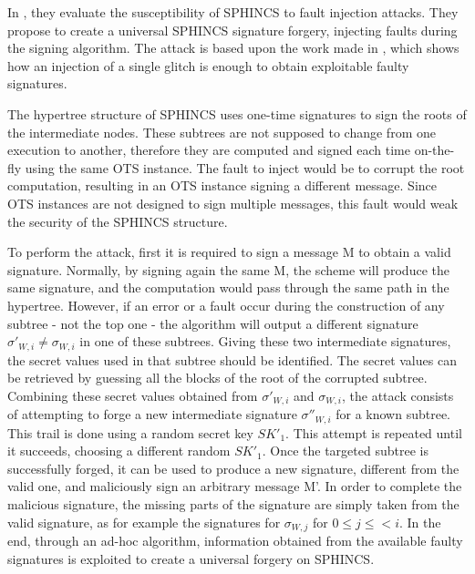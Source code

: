 \documentclass[a4paper,12pt]{article}
\begin{document}

In \cite{12_faultinjection}, they evaluate the susceptibility of SPHINCS to fault injection attacks. They propose to create a universal SPHINCS signature forgery, injecting faults during the signing algorithm.
The attack is based upon the work made in \cite{13_faultattacks}, which shows how an injection of a single glitch is enough to obtain exploitable faulty signatures.

The hypertree structure of SPHINCS uses one-time signatures to sign the roots of the intermediate nodes. These subtrees are not supposed to change from one execution to another, therefore they are computed and signed each time on-the-fly using the same OTS instance.
The fault to inject would be to corrupt the root computation, resulting in an OTS instance signing a different message. Since OTS instances are not designed to sign multiple messages, this fault would weak the security of the SPHINCS structure.

To perform the attack, first it is required to sign a message M to obtain a valid signature.
Normally, by signing again the same M, the scheme will produce the same signature, and the computation would pass through the same path in the hypertree. However, if an error or a fault occur during the construction of any subtree - not the top one - the algorithm will output a different signature $\sigma'_{W,i} \neq \sigma_{W,i}$ in one of these subtrees.
Giving these two intermediate signatures, the secret values used in that subtree should be identified. The secret values can be retrieved by guessing all the blocks of the root of the corrupted subtree.
Combining these secret values obtained from $\sigma'_{W,i}$ and $\sigma_{W,i}$, the attack consists of attempting to forge a new intermediate signature $\sigma''_{W,i}$ for a known subtree. This trail is done using a random secret key $SK'_{1}$. This attempt is repeated until it succeeds, choosing a different random $SK'_{1}$.
Once the targeted subtree is successfully forged, it can be used to produce a new signature, different from the valid one, and maliciously sign an arbitrary message M'. In order to complete the malicious signature, the missing parts of the signature are simply taken from the valid signature, as for example the signatures for $\sigma_{W,j}$ for $0 \leq j \leq < i$.
In the end, through an ad-hoc algorithm, information obtained from the available faulty signatures is exploited to create a universal forgery on SPHINCS.
\end{document}
